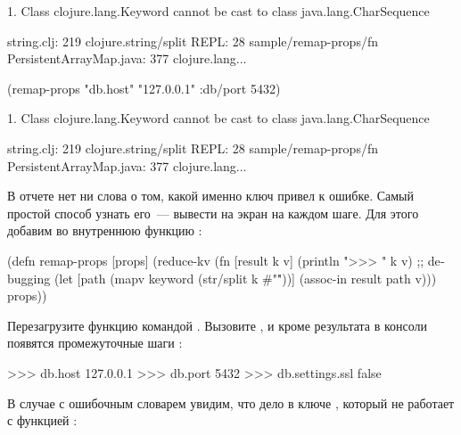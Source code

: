 \begin{english}
  \begin{text}
1. Class clojure.lang.Keyword cannot be cast
   to class java.lang.CharSequence

                string.clj:  219  clojure.string/split
                      REPL:   28  sample/remap-props/fn
   PersistentArrayMap.java:  377  clojure.lang...
  \end{text}
\end{english}

\else

\begin{english}
  \begin{text}
(remap-props {"db.host"
              "127.0.0.1"
              :db/port 5432})

1. Class clojure.lang.Keyword cannot be cast
   to class java.lang.CharSequence

                string.clj:  219  clojure.string/split
                      REPL:   28  sample/remap-props/fn
   PersistentArrayMap.java:  377  clojure.lang...
  \end{text}
\end{english}

\fi

В отчете нет ни слова о том, какой именно ключ привел к ошибке. Самый простой способ узнать его~--- вывести на экран на каждом шаге. Для этого добавим  во внутреннюю функцию  :

\begin{english}
  \begin{clojure/lines}
(defn remap-props [props]
  (reduce-kv
   (fn [result k v]
     (println ">>> " k v) ;; debugging
     (let [path
           (mapv keyword (str/split k #"\."))]
       (assoc-in result path v)))
   {}
   props))
  \end{clojure/lines}
\end{english}

Перезагрузите функцию командой . Вызовите , и кроме результата в консоли появятся промежуточные шаги :

\begin{english}
  \begin{text}
>>>  db.host 127.0.0.1
>>>  db.port 5432
>>>  db.settings.ssl false
  \end{text}
\end{english}

В случае с ошибочным словарем увидим, что дело в ключе , который не работает с функцией :

